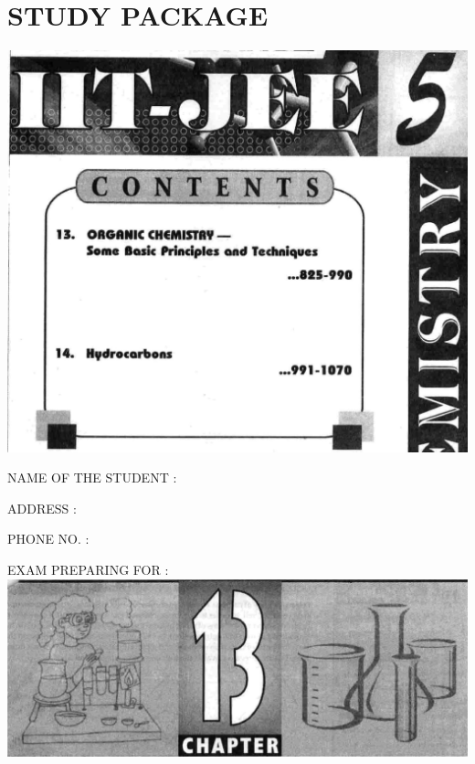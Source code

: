 \documentclass[10pt]{article}
\begin{document}
\section*{STUDY PACKAGE}
\begin{center}
\includegraphics[max width=\textwidth]{2025_01_28_8470952b98110cec3aabg-002}
\end{center}

NAME OF THE STUDENT : $\qquad$

ADDRESS : $\qquad$

PHONE NO. : $\qquad$

EXAM PREPARING FOR : $\qquad$\\
\includegraphics[max width=\textwidth, center]{2025_01_28_8470952b98110cec3aabg-003(1)}
\end{document}
